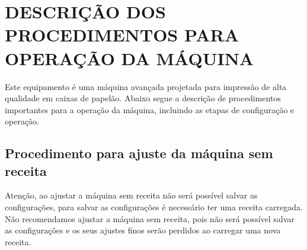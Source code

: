 \thispagestyle{fancy}

\vspace*{40 pt}

\section{\large{DESCRIÇÃO DOS PROCEDIMENTOS PARA OPERAÇÃO DA MÁQUINA}}

Este equipamento é uma máquina avançada projetada para impressão de alta qualidade em caixas de papelão.
Abaixo segue a descrição de procedimentos importantes para a operação da máquina, incluindo as etapas de configuração e operação.

\subsection{Procedimento para ajuste da máquina sem receita}

Atenção, ao ajustar a máquina sem receita não será possível salvar as configurações, para salvar as configurações é necessário ter uma receita carregada.
Não recomendamos ajustar a máquina sem receita, pois não será possível salvar as configurações e os seus ajustes finos serão perdidos ao carregar uma nova receita.


